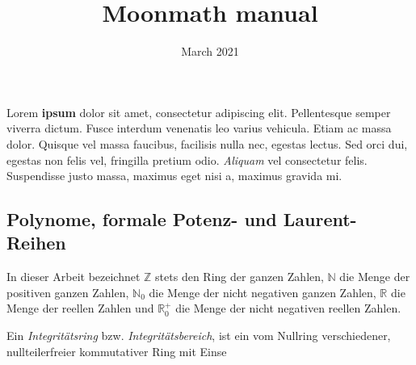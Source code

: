 \documentclass{article}
\title{Moonmath manual}
\author{}
\date{March 2021}
\begin{document}
\maketitle

Lorem \textbf{ipsum} dolor sit amet, consectetur adipiscing elit. Pellentesque semper viverra dictum.  Fusce interdum venenatis leo varius vehicula. Etiam ac massa dolor. Quisque vel massa faucibus, facilisis nulla nec, egestas lectus. Sed orci dui, egestas non felis vel, fringilla pretium odio. \textit{Aliquam} vel consectetur felis. Suspendisse justo massa, maximus eget nisi a, maximus gravida mi.




\subsection{Polynome, formale Potenz- und Laurent-Reihen}
In dieser Arbeit bezeichnet $\mathbb{Z}$ stets den Ring der ganzen Zahlen, $\mathbb{N}$ die Menge der positiven ganzen Zahlen, 
$\mathbb{N}_0$ die Menge der nicht negativen ganzen Zahlen, 
$\mathbb{R}$ die Menge der reellen Zahlen und $\mathbb{R}^+_0$ die Menge
der nicht negativen reellen Zahlen.

Ein \textit{Integritätsring} bzw. \textit{Integritätsbereich}, ist ein vom Nullring verschiedener, nullteilerfreier kommutativer Ring mit Einse
\end{document}
